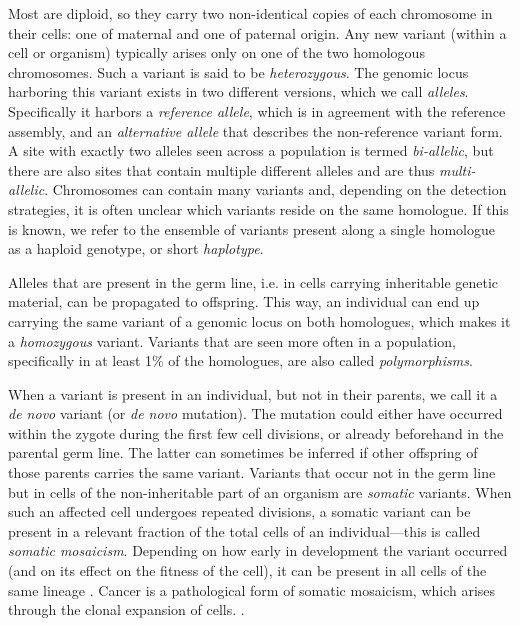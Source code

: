 Most  are diploid, so they carry two non-identical
copies of each chromosome in their cells: one of maternal and one of paternal origin. Any new
variant (within a cell or organism) typically arises only on one of the two
homologous chromosomes. Such a variant is said to be \emph{heterozygous}. The
genomic locus harboring this variant exists in two different versions, which we
call \emph{alleles}. Specifically it harbors a \emph{reference allele}, which is
in agreement with the reference assembly, and
an \emph{alternative allele} that describes the non-reference variant form. A
site with exactly two alleles seen across a population is termed
\emph{bi-allelic}, but there are also sites that contain multiple different
alleles and are thus \emph{multi-allelic}. Chromosomes can contain many variants
and, depending on the detection strategies, it is often unclear which variants
reside on the same homologue. If this is known, we refer to the ensemble of
variants present along a single homologue as a haploid genotype, or short
\emph{haplotype}.

Alleles that are present in the germ line, i.e. in cells
carrying inheritable genetic material, can be propagated to offspring. This way,
an individual can end up carrying the same variant of a genomic locus on both
homologues, which makes it a \emph{homozygous} variant. Variants that are seen
more often in a population, specifically in at least 1\% of the homologues,
are also called \emph{polymorphisms}.

When a variant is present in an individual, but not in their parents, we call it
a \emph{de novo} variant (or \emph{de novo} mutation). The mutation could
either have occurred within the
zygote during the first few cell divisions, or already beforehand in the
parental germ line. The latter can sometimes be inferred if other offspring of
those parents carries the same variant. Variants that occur not in the germ line
but in cells of the non-inheritable part of an organism are \emph{somatic}
variants. When such an affected cell undergoes repeated divisions, a somatic variant
can be present in a relevant fraction of the total cells of an individual---this
is called \emph{somatic mosaicism}. Depending on how early in development the
variant occurred (and on its effect on the fitness of the cell), it can be present in all cells of the
same lineage \citep{Youssoufian2002}. Cancer is a pathological form of somatic
mosaicism, which arises through the clonal expansion of cells. \citep{Campbell2007}.


